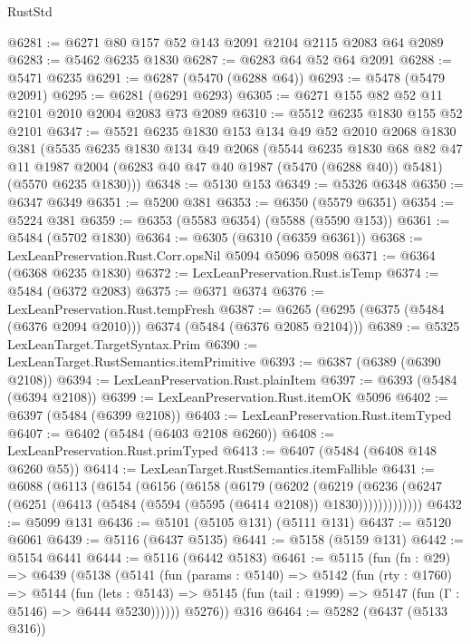 \begin{lexlean}{RustStd}
\begin{coremodule}
{\begin{coremodule}
{{{{{{{{{{{{{{{{{{{{{{{{{{{{{{{@6281 := @6271 @80 @157 @52 @143 @2091 @2104 @2115 @2083 @64 @2089
@6283 := @5462 @6235 @1830
@6287 := @6283 @64 @52 @64 @2091
@6288 := @5471 @6235
@6291 := @6287 (@5470 (@6288 @64))
@6293 := @5478 (@5479 @2091)
@6295 := @6281 (@6291 @6293)
@6305 := @6271 @155 @82 @52 @11 @2101 @2010 @2004 @2083 @73 @2089
@6310 := @5512 @6235 @1830 @155 @52 @2101
@6347 := @5521
    @6235
    @1830
    @153
    @134
    @49
    @52
    @2010
    @2068
    @1830
    @381
    (@5535
      @6235
      @1830
      @134
      @49
      @2068
      (@5544
        @6235
        @1830
        @68
        @82
        @47
        @11
        @1987
        @2004
        (@6283 @40 @47 @40 @1987 (@5470 (@6288 @40)) @5481)
        (@5570 @6235 @1830)))
@6348 := @5130 @153
@6349 := @5326 @6348
@6350 := @6347 @6349
@6351 := @5200 @381
@6353 := @6350 (@5579 @6351)
@6354 := @5224 @381
@6359 := @6353 (@5583 @6354) (@5588 (@5590 @153))
@6361 := @5484 (@5702 @1830)
@6364 := @6305 (@6310 (@6359 @6361))
@6368 := LexLeanPreservation.Rust.Corr.opsNil @5094 @5096 @5098
@6371 := @6364 (@6368 @6235 @1830)
@6372 := LexLeanPreservation.Rust.isTemp
@6374 := @5484 (@6372 @2083)
@6375 := @6371 @6374
@6376 := LexLeanPreservation.Rust.tempFresh
@6387 := @6265 (@6295 (@6375 (@5484 (@6376 @2094 @2010))) @6374 (@5484 (@6376 @2085 @2104)))
@6389 := @5325 LexLeanTarget.TargetSyntax.Prim
@6390 := LexLeanTarget.RustSemantics.itemPrimitive
@6393 := @6387 (@6389 (@6390 @2108))
@6394 := LexLeanPreservation.Rust.plainItem
@6397 := @6393 (@5484 (@6394 @2108))
@6399 := LexLeanPreservation.Rust.itemOK @5096
@6402 := @6397 (@5484 (@6399 @2108))
@6403 := LexLeanPreservation.Rust.itemTyped
@6407 := @6402 (@5484 (@6403 @2108 @6260))
@6408 := LexLeanPreservation.Rust.primTyped
@6413 := @6407 (@5484 (@6408 @148 @6260 @55))
@6414 := LexLeanTarget.RustSemantics.itemFallible
@6431 := @6088
    (@6113
      (@6154
        (@6156
          (@6158
            (@6179
              (@6202
                (@6219
                  (@6236 (@6247 (@6251 (@6413 (@5484 (@5594 (@5595 (@6414 @2108)) @1830)))))))))))))
@6432 := @5099 @131
@6436 := @5101 (@5105 @131) (@5111 @131)
@6437 := @5120 @6061
@6439 := @5116 (@6437 @5135)
@6441 := @5158 (@5159 @131)
@6442 := @5154 @6441
@6444 := @5116 (@6442 @5183)
@6461 := @5115
    (fun (fn : @29) =>
    @6439
      (@5138
        (@5141
          (fun (params : @5140) =>
          @5142
            (fun (rty : @1760) =>
            @5144
              (fun (lets : @5143) =>
              @5145 (fun (tail : @1999) => @5147 (fun (Γ : @5146) => @6444 @5230))))))
        @5276))
    @316
@6464 := @5282 (@6437 (@5133 @316))
}}}}}}}}}}}}}}}}}}}}}}}}}}}}}}}
\end{coremodule}}
\end{coremodule}
\end{lexlean}
